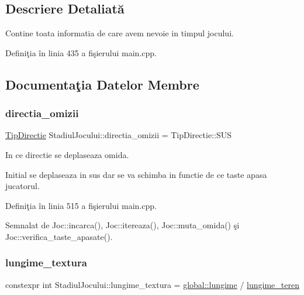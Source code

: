 \subsection{Descriere Detaliată}
Contine toata informatia de care avem nevoie in timpul jocului. 

Definiţia în linia 435 a fişierului main.\+cpp.



\subsection{Documentaţia Datelor Membre}
\mbox{\label{classStadiulJocului_a79d2c301f57a7fc525534994ffd7057e}} 
\subsubsection{\texorpdfstring{directia\+\_\+omizii}{directia\_omizii}}
{\footnotesize\ttfamily \hyperlink{main_8cpp_aea66a0d525bf9bfb9b61e9cc1ba0b752}{Tip\+Directie} Stadiul\+Jocului\+::directia\+\_\+omizii = Tip\+Directie\+::\+S\+US}



In ce directie se deplaseaza omida. 

Initial se deplaseaza in sus dar se va schimba in functie de ce taste apasa jucatorul. 

Definiţia în linia 515 a fişierului main.\+cpp.



Semnalat de Joc\+::incarca(), Joc\+::itereaza(), Joc\+::muta\+\_\+omida() şi Joc\+::verifica\+\_\+taste\+\_\+apasate().

\mbox{\label{classStadiulJocului_ad66a6d4dd8dcbebe7df6098696f205a5}} 
\subsubsection{\texorpdfstring{lungime\+\_\+textura}{lungime\_textura}}
{\footnotesize\ttfamily constexpr int Stadiul\+Jocului\+::lungime\+\_\+textura = \hyperlink{namespaceglobal_a5ad71f80dc82eb6fd1036c8055a5dfbc}{global\+::lungime} / \hyperlink{classStadiulJocului_ab1b866a96905e3491008c1e7268d9983}{lungime\+\_\+teren}\hspace{0.3cm}{\ttfamily [static]}}



